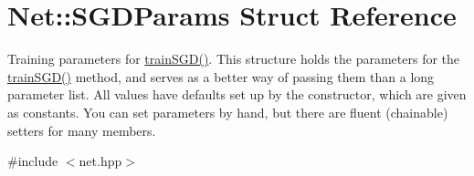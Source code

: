 \hypertarget{structNet_1_1SGDParams}{}\section{Net\+:\+:S\+G\+D\+Params Struct Reference}
\label{structNet_1_1SGDParams}


Training parameters for \hyperlink{classNet_a4e527a7773eed5fb071b78ef3a636c95}{train\+S\+G\+D()}. This structure holds the parameters for the \hyperlink{classNet_a4e527a7773eed5fb071b78ef3a636c95}{train\+S\+G\+D()} method, and serves as a better way of passing them than a long parameter list. All values have defaults set up by the constructor, which are given as constants. You can set parameters by hand, but there are fluent (chainable) setters for many members.  




{\ttfamily \#include $<$net.\+hpp$>$}

